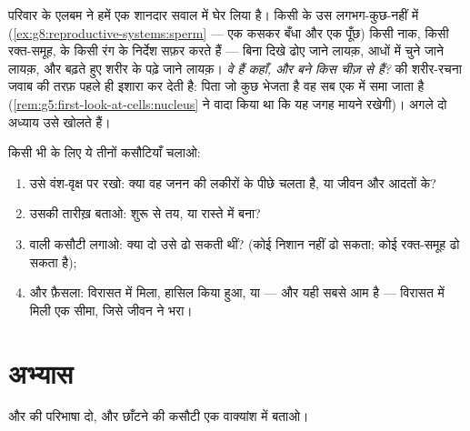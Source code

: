\begin{remark}[यह जो सवाल खड़ा करता है]\label{rem:g9:heredity-and-traits:question}
परिवार के एलबम ने हमें एक शानदार सवाल में घेर लिया है। किसी  के
उस लगभग-कुछ-नहीं में (\cref{ex:g8:reproductive-systems:sperm} --- एक
कसकर बँधा  और एक पूँछ) किसी नाक, किसी रक्त-समूह,  के किसी
रंग के निर्देश सफ़र करते हैं --- बिना दिखे ढोए जाने लायक़, आधों में चुने
जाने लायक़, और बढ़ते हुए शरीर के पढ़े जाने लायक़। \emph{वे हैं कहाँ, और
बने किस चीज़ से हैं?}  की शरीर-रचना जवाब की तरफ़ पहले ही इशारा कर
देती है: पिता जो कुछ भेजता है वह सब एक  में समा जाता है
(\cref{rem:g5:first-look-at-cells:nucleus} ने वादा किया था कि यह जगह
मायने रखेगी)। अगले दो अध्याय उसे खोलते हैं।
\end{remark}

\begin{method}[किसी लक्षण की जाँच-पड़ताल]\label{met:g9:heredity-and-traits:audit}
किसी भी  के लिए ये तीनों कसौटियाँ चलाओ:
\begin{enumerate}
  \item उसे वंश-वृक्ष पर रखो: क्या वह जनन की लकीरों के पीछे चलता है,
        या जीवन और आदतों के?
  \item उसकी तारीख़ बताओ: शुरू से तय, या रास्ते में बना?
  \item {} वाली कसौटी लगाओ: क्या दो  उसे ढो सकती थीं?
        (कोई निशान नहीं ढो सकता; कोई रक्त-समूह ढो सकता है);
  \item और फ़ैसला: विरासत में मिला, हासिल किया हुआ, या --- और यही सबसे
        आम है --- विरासत में मिली एक सीमा, जिसे जीवन ने भरा।
\end{enumerate}
\end{method}

\section{अभ्यास}

\begin{exercise}[$\star$]\label{exo:g9:heredity-and-traits:1}
 और  की परिभाषा दो, और छाँटने की कसौटी एक वाक्यांश में
बताओ।
\end{exercise}

